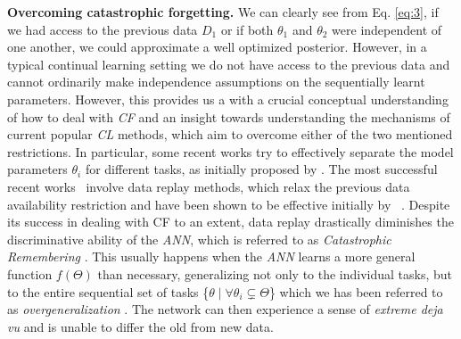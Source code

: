 \documentclass{article}
\newcommand\numberthis{\addtocounter{equation}{1}\tag{\theequation}}
\begin{document}
\textbf{Overcoming catastrophic forgetting.} We can clearly see from Eq. \ref{eq:3}, if we had access to the previous data $D_1$ or if both $\theta_1$ and  $\theta_2$ were independent of one another, we could approximate a well optimized posterior. However, in a typical continual learning setting we do not have access to the previous data and cannot ordinarily make independence assumptions on the sequentially learnt parameters. However, this provides us a with a crucial conceptual understanding of how to deal with \textit{CF} and an insight towards understanding the mechanisms of current popular \textit{CL} methods, which aim to overcome either of the two mentioned restrictions.
In particular, some recent works \cite{mallya, Serr2018OvercomingCF, jung2020continual} try to effectively separate the model parameters $\theta_i$ for different tasks, as initially proposed by \cite{French94dynamicallyconstraining}. 
The most successful recent works~\cite{pan2021continual, titsias2019functional, Chaudhry_2018_ECCV, guo2020improved, fear17} involve data replay methods, which relax the previous data availability restriction and have been shown to be effective initially by ~\cite{robins_catastrophic_1993}.
Despite its success in dealing with CF to an extent, data replay drastically diminishes the discriminative ability of the \textit{ANN}, which is referred to as \textit{Catastrophic Remembering} \cite{robins_catastrophic_1993}. This usually happens when the \textit{ANN} learns a more general function $f(\Theta)$ than necessary,  generalizing 
not only to the individual tasks, but to the entire sequential set of tasks \{$\theta\mid \forall\theta_i \subsetneq \Theta$\} which we has been referred to as \textit{overgeneralization} \cite{robins_catastrophic_1993}. 
The network can then experience a sense of \textit{extreme deja vu} \cite{doi:10.1080/09540099550039264} and is unable to differ the old from new data. 


\iffalse Assuming, we have access to previous data in some way as well as \textit{well distributed, well separated} independent parameters, we could, in theory, deal with the problem of \textit{catastrophic forgetting} because, for $N$ tasks, Eq. \eqref{eq:3} will be reduced to,
\begin{align*}
        \log \mathcal{P}(\theta_{1:n}|D_{1:n}) = &\sum_{i=1}^n[\log \mathcal{P}(D_i|\theta_i)-\log \mathcal{P}(D_i)]\\&+\log\mathcal{P}(\theta_i)\numberthis\label{eq:4}\\
\Rightarrow \log \mathcal{P}(\Theta|\mathcal{D}) \propto &\sum_{i=1}^n[\log \mathcal{P}(D_i|\theta_i)]+\log\mathcal{P}(\theta_i) \numberthis\label{eq:5}
\end{align*}
Assuming the value of $\sum_i^n \log \mathcal{P}(D_i)$ to be equivalent to some constant value, we ignore it in \eqref{eq:5}. Practically, the scenario presented by \eqref{eq:4},\eqref{eq:5} is clearly not possible but it does provide us with an understanding of an ideal \textit{CF} alleviation scenario.
\fi
\end{document}
